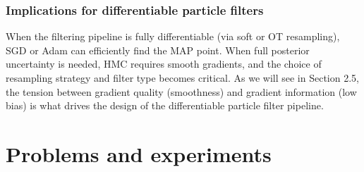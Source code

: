 \documentclass{article}
\begin{document}
\subsubsection{Implications for differentiable particle filters}
When the filtering pipeline is fully differentiable (via soft or OT resampling), SGD or Adam can efficiently find the MAP point. When full posterior uncertainty is needed, HMC requires smooth gradients, and the choice of resampling strategy and filter type becomes critical. As we will see in Section 2.5, the tension between gradient quality (smoothness) and gradient information (low bias) is what drives the design of the differentiable particle filter pipeline.


\newpage
\section{Problems and experiments}
\end{document}
